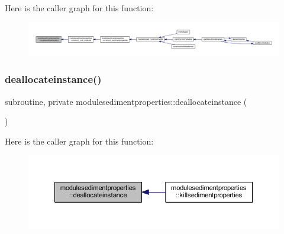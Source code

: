 Here is the caller graph for this function\+:\nopagebreak
\begin{figure}[H]
\begin{center}
\leavevmode
\includegraphics[width=350pt]{namespacemodulesedimentproperties_ab1ad9fb8e7d7a22675312273d0b5abc5_icgraph}
\end{center}
\end{figure}
\mbox{\label{namespacemodulesedimentproperties_a2d719466ca9047ba28957d7df363ad7b}} 
\subsubsection{\texorpdfstring{deallocateinstance()}{deallocateinstance()}}
{\footnotesize\ttfamily subroutine, private modulesedimentproperties\+::deallocateinstance (\begin{DoxyParamCaption}{ }\end{DoxyParamCaption})\hspace{0.3cm}{\ttfamily [private]}}

Here is the caller graph for this function\+:\nopagebreak
\begin{figure}[H]
\begin{center}
\leavevmode
\includegraphics[width=350pt]{namespacemodulesedimentproperties_a2d719466ca9047ba28957d7df363ad7b_icgraph}
\end{center}
\end{figure}
\mbox{\label{namespacemodulesedimentproperties_ab83ce67b0749c96200f2b82879c0b349}} 
